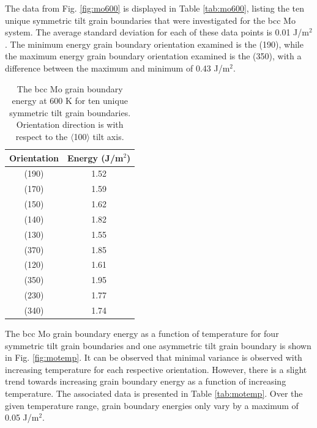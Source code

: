 \documentclass[review]{elsarticle}
\begin{document}
\FloatBarrier

The data from Fig. \ref{fig:mo600} is displayed in Table \ref{tab:mo600}, listing the ten unique symmetric tilt grain boundaries that were investigated for the bcc Mo system. The average standard deviation for each of these data points is 0.01 J/m$^{2}$. The minimum energy grain boundary orientation examined is the (190), while the maximum energy grain boundary orientation examined is the (350), with a difference between the maximum and minimum of 0.43 J/m$^{2}$.

\begin{table}[h]
\caption{The bcc Mo grain boundary energy at 600 K for ten unique symmetric tilt grain boundaries. Orientation direction is with respect to the $\langle$100$\rangle$ tilt axis.} \label{tab:mo600}
\begin{center}
\begin{tabular}{|c|c|}
	\hline
	Orientation & Energy (J/m$^{2}$) \\
	 \hline
	 (190) & 1.52 \\
	 (170) & 1.59 \\
	 (150) & 1.62 \\
	 (140) & 1.82 \\
	 (130) & 1.55 \\	 
	 (370) & 1.85 \\
	 (120) & 1.61 \\
	 (350) & 1.95 \\
	 (230) & 1.77 \\
	 (340) & 1.74 \\
	 \hline
\end{tabular}
\end{center}
\label{default}
\end{table}

\FloatBarrier

The bcc Mo grain boundary energy as a function of temperature for four symmetric tilt grain boundaries and one asymmetric tilt grain boundary is shown in Fig. \ref{fig:motemp}. It can be observed that minimal variance is observed with increasing temperature for each respective orientation. However, there is a slight trend towards increasing grain boundary energy as a function of increasing temperature. The associated data is presented in Table \ref{tab:motemp}. Over the given temperature range, grain boundary energies only vary by a maximum of 0.05 J/m$^{2}$.
\end{document}
